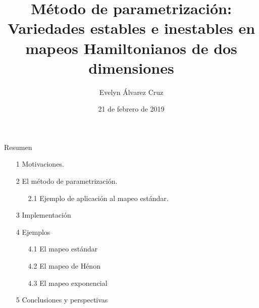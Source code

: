 \documentclass{beamer}		%
\date{21 de febrero de 2019}	%
\title[Parametrizaci\'on]{M\'etodo de parametrizaci\'on:\\Variedades estables e inestables en mapeos Hamiltonianos de dos dimensiones}	%
\author[E. \'Alvarez]{Evelyn \'Alvarez Cruz} %
\institute[FC]{Facultad de Ciencias\\ Universidad Nacional Aut\'onoma de M\'exico} %
\begin{document}


\begin{frame}	

\titlepage	%
	
\end{frame}	

\begin{frame}{Resumen}	
\begin{itemize}
    \item[1] Motivaciones.
    \item[2] El m\'etodo de parametrizaci\'on.
    \begin{itemize}
        \item[2.1] Ejemplo de aplicaci\'on al mapeo est\'andar. 
    \end{itemize}
    \item[3] Implementaci\'on
    \item[4] Ejemplos
    \begin{itemize}
        \item[4.1] El mapeo est\'andar
        \item[4.2] El mapeo de H\'enon
        \item[4.3] El mapeo exponencial
    \end{itemize}
    \item[5] Conclusiones y perspectivas
\end{itemize}

\end{frame}



\end{document}
